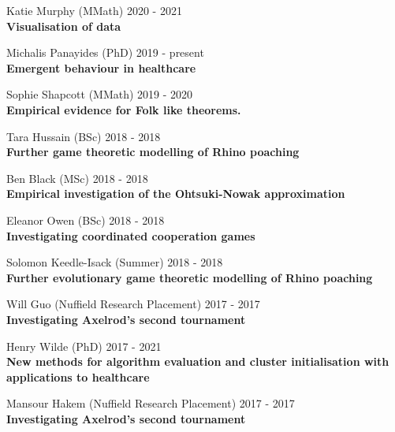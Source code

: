 \documentclass[10pt]{res} %
\begin{document}
\begin{resume}
\begin{etaremune}
\item
    Katie Murphy (MMath) \hfill 2020 -
    2021\\
\textbf{Visualisation of data}\\

\item
    Michalis Panayides (PhD) \hfill 2019 -
    present\\
\textbf{Emergent behaviour in healthcare}\\

\item
    Sophie Shapcott (MMath) \hfill 2019 -
    2020\\
\textbf{Empirical evidence for Folk like theorems.}\\

\item
    Tara Hussain (BSc) \hfill 2018 -
    2018\\
\textbf{Further game theoretic modelling of Rhino poaching}\\

\item
    Ben Black (MSc) \hfill 2018 -
    2018\\
\textbf{Empirical investigation of the Ohtsuki-Nowak approximation}\\

\item
    Eleanor Owen (BSc) \hfill 2018 -
    2018\\
\textbf{Investigating coordinated cooperation games}\\

\item
    Solomon Keedle-Isack (Summer) \hfill 2018 -
    2018\\
\textbf{Further evolutionary game theoretic modelling of Rhino poaching}\\

\item
    Will Guo (Nuffield Research Placement) \hfill 2017 -
    2017\\
\textbf{Investigating Axelrod's second tournament}\\

\item
    Henry Wilde (PhD) \hfill 2017 -
    2021\\
\textbf{New methods for algorithm evaluation and cluster initialisation with applications to healthcare}\\

\item
    Mansour Hakem (Nuffield Research Placement) \hfill 2017 -
    2017\\
\textbf{Investigating Axelrod's second tournament}\\


\end{etaremune}
\end{resume}
\end{document}
